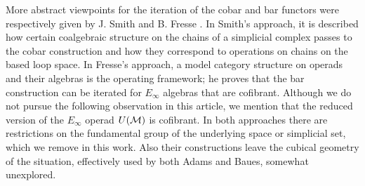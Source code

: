 More abstract viewpoints for the iteration of the cobar and bar functors were respectively given by J. Smith \cite{smith1994cobar} and B. Fresse \cite{fresse2010props}.
In Smith's approach, it is described how certain coalgebraic structure on the chains of a simplicial complex passes to the cobar construction and how they correspond to operations on chains on the based loop space.
In Fresse's approach, a model category structure on operads and their algebras is the operating framework; he proves that the bar construction can be iterated for $E_\infty$ algebras that are cofibrant.
Although we do not pursue the following observation in this article, we mention that the reduced version of the $E_\infty$ operad $U(\mathcal{M})$ is cofibrant. In both approaches there are restrictions on the fundamental group of the underlying space or simplicial set, which we remove in this work. Also their constructions leave the cubical geometry of the situation, effectively used by both Adams and Baues, somewhat unexplored.







